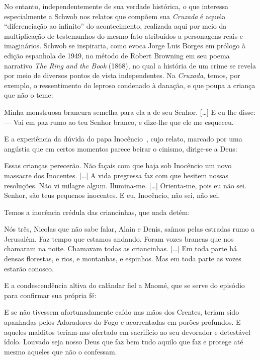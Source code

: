 No entanto, independentemente de sua verdade histórica, o que interessa
especialmente a Schwob nos relatos que compõem sua \textit{Cruzada} é aquela
“diferenciação ao infinito” do acontecimento, realizada aqui por meio da
multiplicação de testemunhos do mesmo fato atribuídos a personagens reais e
imaginários. Schwob se inspiraria, como evoca Jorge Luis Borges em prólogo à
edição espanhola de 1949, no método de Robert Browning em seu poema narrativo
\textit{The Ring and the Book} (1868), no qual a história de um crime se revela
 por meio de diversos pontos de vista independentes. Na \textit{Cruzada},
temos, por exemplo, o ressentimento do leproso condenado à danação, e que poupa
a criança que não o teme: 

\begin{hedraquote}
Minha monstruosa brancura semelha para ela a de seu
Senhor. [\ldots{}] E eu lhe disse: --- Vai em paz rumo ao teu Senhor branco, e
dize-lhe que ele me esqueceu.
\end{hedraquote}

E a experiência da dúvida do papa
Inocêncio~, cujo relato, marcado por uma angústia que em certos momentos
parece beirar o cinismo, dirige-se a Deus: 

\begin{hedraquote}
Essas crianças perecerão. Não
façais com que haja sob Inocêncio um novo massacre dos Inocentes. [\ldots{}] A vida
pregressa faz com que hesitem nossas resoluções. Não vi milagre algum.
Ilumina-me. [\ldots{}] Orienta-me, pois eu não sei. Senhor, são teus pequenos
inocentes. E eu, Inocêncio, não sei, não sei.
\end{hedraquote} 

Temos a inocência
crédula das criancinhas, que nada detém:

\begin{hedraquote}
Nós três, Nicolas que não sabe falar,
Alain e Denis, saímos pelas estradas rumo a Jerusalém. Faz tempo que estamos
andando. Foram vozes brancas que nos chamaram na noite. Chamavam todas as
criancinhas. [\ldots{}] Em toda parte há densas florestas, e rios, e montanhas, e
espinhos. Mas em toda parte as vozes estarão conosco.
\end{hedraquote} 

E a condescendência altiva do calândar fiel a Maomé, que se serve do episódio para
confirmar sua própria fé:

\begin{hedraquote}
E se não tivessem afortunadamente caído nas mãos
dos Crentes, teriam sido apanhadas pelos Adoradores do Fogo e acorrentadas em
porões profundos. E aqueles malditos teriam-nas ofertado em sacrifício ao seu
devorador e detestável ídolo. Louvado seja nosso Deus que faz bem tudo aquilo
que faz e protege até mesmo aqueles que não o confessam.
\end{hedraquote} 

